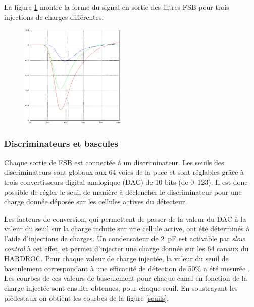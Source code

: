La figure \ref{signal} montre la forme du signal en sortie des filtres FSB pour trois injections de charges différentes.
\begin{figure}[ht!]
	\centering
	\includegraphics[width=0.45\textwidth]{GLA/SIGNAL.png}
	\label{signal}
\end{figure}

\vspace*{-1.2cm}

\subsubsection{Discriminateurs et bascules}
Chaque sortie de FSB est connectée à un discriminateur. Les seuils des discriminateurs sont globaux aux \num{64} voies de la puce et sont réglables grâce à trois convertisseurs digital-analogique (DAC) de \num{10} bits (de \SIrange{0}{123}{}). Il est donc possible de régler le seuil de manière à déclencher le discriminateur pour une charge donnée déposée sur les cellules actives du détecteur.

Les facteurs de conversion, qui permettent de passer de la valeur du DAC à la valeur du seuil sur la charge induite sur une cellule active, ont été déterminés à l'aide d'injections de charges. Un condensateur de \SI{2}{\pico\farad} est activable par \textit{slow control} à cet effet, et permet d'injecter une charge donnée sur les \num{64} canaux du HARDROC. Pour chaque valeur de charge injectée, la valeur du seuil de basculement correspondant à une efficacité de détection de 50\% a été mesurée \cite{kieffer:tel-00751999}. Les courbes de ces valeurs de basculement pour chaque canal en fonction de la charge injectée sont ensuite obtenues, pour chaque seuil. En soustrayant les piédestaux on obtient les courbes de la figure \ref{seuils}.

